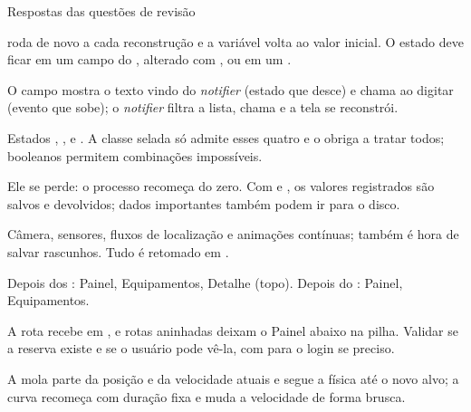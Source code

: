 \documentclass[aspectratio=169,10pt]{beamer}
\begin{document}
\begin{frame}{Respostas das questões de revisão}
  \begin{respostas}
    \item {} roda de novo a cada reconstrução e a variável volta ao valor inicial. O estado deve ficar em um campo do , alterado com , ou em um .
    \item O campo mostra o texto vindo do \emph{notifier} (estado que desce) e chama  ao digitar (evento que sobe); o \emph{notifier} filtra a lista, chama  e a tela se reconstrói.
    \item Estados , ,  e . A classe selada só admite esses quatro e o  obriga a tratar todos; booleanos permitem combinações impossíveis.
    \item Ele se perde: o processo recomeça do zero. Com  e , os valores registrados são salvos e devolvidos; dados importantes também podem ir para o disco.
    \item Câmera, sensores, fluxos de localização e animações contínuas; também é hora de salvar rascunhos. Tudo é retomado em .
    \item Depois dos : Painel, Equipamentos, Detalhe (topo). Depois do : Painel, Equipamentos.
    \item A rota  recebe  em , e rotas aninhadas deixam o Painel abaixo na pilha. Validar se a reserva existe e se o usuário pode vê-la, com  para o login se preciso.
    \item A mola parte da posição e da velocidade atuais e segue a física até o novo alvo; a curva recomeça com duração fixa e muda a velocidade de forma brusca.
  \end{respostas}
\end{frame}

\end{document}
